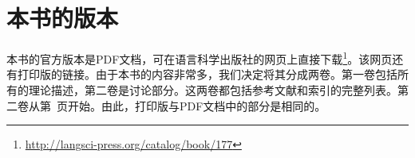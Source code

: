 
\section*{本书的版本}

本书的官方版本是PDF文档，可在语言科学出版社的网页上直接下载\footnote{%
\url{http://langsci-press.org/catalog/book/177}
}。该网页还有打印版的链接。由于本书的内容非常多，我们决定将其分成两卷。第一卷包括所有的理论描述，第二卷是讨论部分。这两卷都包括参考文献和索引的完整列表。第二卷从第~\pageref{part-discussion}页开始。由此，打印版与PDF文档中的部分是相同的。








